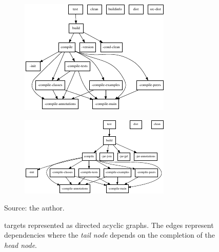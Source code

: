 \documentclass{article}
\begin{document}
\begin{figure}[h!]
    \centering
    \begin{subfigure}[b]{0.75\textwidth}
        \centering
        \includegraphics[width=.9\textwidth]{figs/jpf-tasks.pdf}%
        \caption{\jpfcore{}}
    \end{subfigure}
    \qquad
    \begin{subfigure}[b]{0.8\textwidth}
        \vspace{5mm}
        \centering
        \includegraphics[width=\textwidth]{figs/symbc-tasks.pdf}%
        \caption{\jpfsymbc{}}
    \end{subfigure}
    \caption{\ant{} targets represented as directed acyclic graphs. The edges
    represent dependencies where the \emph{tail node} depends on the completion
    of the \emph{head node}.\label{fig:tasks}}
    {\scriptsize Source: the author.}
\end{figure}
\end{document}
